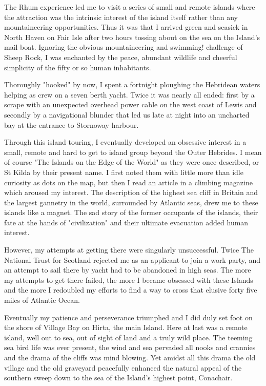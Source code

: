 \documentclass[a5paper,openany,font 10pt]{scrbook}
\begin{document}
The Rhum experience led me to visit a series of small and remote
islands where the attraction was the intrinsic interest of the island
itself rather than any mountaineering opportunities.  Thus it was that
I arrived green and seasick in North Haven on Fair Isle after two
hours tossing about on the sea on the Island's mail boat. Ignoring the
obvious mountaineering and swimming!  challenge of Sheep Rock, I was
enchanted by the peace, abundant wildlife and cheerful simplicity of
the fifty or so human inhabitants.

Thoroughly "hooked" by now, I spent a fortnight ploughing the
Hebridean waters helping as crew on a seven berth yacht.  Twice it was
nearly all ended: first by a scrape with an unexpected overhead power
cable on the west coast of Lewis and secondly by a navigational
blunder that led us late at night into an uncharted bay at the
entrance to Stornoway harbour.

Through this island touring, I eventually developed an obsessive
interest in a small, remote and hard to get to island group beyond the
Outer Hebrides. I mean of course "The Islands on the Edge of the
World" as they were once described, or St Kilda by their present
name. I first noted them with little more than idle curiosity as dots
on the map, but then I read an article in a climbing magazine which
aroused my interest. The description of the highest sea cliff in
Britain and the largest gannetry in the world, surrounded by Atlantic
seas, drew me to these islands like a magnet. The sad story of the
former occupants of the islands, their fate at the hands of
"civilization" and their ultimate evacuation added human interest.

However, my attempts at getting there were singularly
unsuccessful. Twice The National Trust for Scotland rejected me as an
applicant to join a work party, and an attempt to sail there by yacht
had to be abandoned in high seas. The more my attempts to get there
failed, the more I became obsessed with these Islands and the more I
redoubled my efforts to find a way to cross that elusive forty five
miles of Atlantic Ocean.

Eventually my patience and perseverance triumphed and I did duly set
foot on the shore of Village Bay on Hirta, the main Island. Here at
last was a remote island, well out to sea, out of sight of land and a
truly wild place. The teeming sea bird life was ever present, the wind
and sea pervaded all nooks and crannies and the drama of the cliffs
was mind blowing. Yet amidst all this drama the old village and the
old graveyard peacefully enhanced the natural appeal of the southern
sweep down to the sea of the Island's highest point, Conachair.
\end{document}

